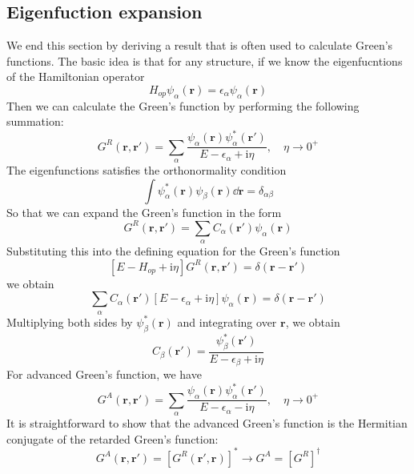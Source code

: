 \documentclass[11pt,a4paper]{book}
\theoremstyle{plain}
\theoremstyle{definition}
\theoremstyle{remark}
\newcommand{\ii}{\mathrm{i}}                      %
\renewcommand{\vec}[1]{\boldsymbol{#1}}
\begin{document}
\subsection{Eigenfuction expansion}
We end this section by deriving a result that is often used to calculate Green's functions. The basic idea is that for any structure, if we know the eigenfucntions of the Hamiltonian operator
\begin{equation}
    H_{op} \psi_\alpha(\vec{r}) = \epsilon_\alpha \psi_\alpha(\vec{r})
\end{equation}
Then we can calculate the Green's function by performing the following summation:
\begin{equation}
    G^R(\vec{r},\vec{r}') = \sum_\alpha \frac{\psi_\alpha(\vec{r}) \psi_\alpha^*(\vec{r}')}{E - \epsilon_\alpha + \ii \eta}, \quad \eta \to 0^+
\end{equation}
The eigenfunctions satisfies the orthonormality condition
\begin{equation}
    \int \psi_\alpha^*(\vec{r}) \psi_\beta(\vec{r}) \dd \vec{r} = \delta_{\alpha \beta}
\end{equation}
So that we can expand the Green's function in the form
\begin{equation}
    G^R(\vec{r},\vec{r}') = \sum_\alpha C_\alpha(\vec{r}') \psi_\alpha(\vec{r})
\end{equation}
Substituting this into the defining equation for the Green's function
\begin{equation}
    \left[E - H_{op} + \ii \eta \right] G^R(\vec{r},\vec{r}') = \delta(\vec{r} - \vec{r}')
\end{equation}
we obtain
\begin{equation}
    \sum_\alpha C_\alpha(\vec{r}') \left[E - \epsilon_\alpha + \ii \eta \right] \psi_\alpha(\vec{r}) = \delta(\vec{r} - \vec{r}')
\end{equation}
Multiplying both sides by $\psi_\beta^*(\vec{r})$ and integrating over $\vec{r}$, we obtain
\begin{equation}
    C_\beta(\vec{r}')  = \frac{\psi_\beta^*(\vec{r}')}{E - \epsilon_\beta + \ii \eta }
\end{equation}
For advanced Green's function, we have
\begin{equation}
    G^A(\vec{r},\vec{r}') = \sum_\alpha \frac{\psi_\alpha(\vec{r}) \psi_\alpha^*(\vec{r}')}{E - \epsilon_\alpha - \ii \eta}, \quad \eta \to 0^+
\end{equation}
It is straightforward to show that the advanced Green's function is the Hermitian conjugate of the retarded Green's function:
\begin{equation}
    G^A(\vec{r},\vec{r}') = \left[ G^R(\vec{r}',\vec{r}) \right]^* \rightarrow G^A = \left[G^R\right]^\dagger
\end{equation}
\end{document}
